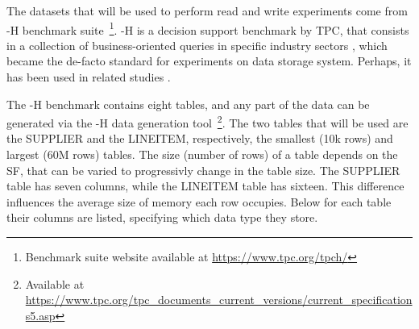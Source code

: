 The datasets that will be used to perform read and write experiments come from -H benchmark suite~\footnote{Benchmark suite website available at \url{https://www.tpc.org/tpch/}}. -H is a decision support benchmark by \gls{TPC}, that consists in a collection of business-oriented queries in specific industry sectors \cite{transactionprocessingperformancecounciltpcTPCH_v301pdf1993}, which became the de-facto standard for experiments on data storage system. Perhaps, it has been used in related studies \cite{raasveldtDuckDBEmbeddableAnalytical2019,behmPhotonFastQuery2022,manfrediReducingReadWrite2024}. 

The -H benchmark contains eight tables, and any part of the data can be generated via the -H data generation tool~\footnote{Available at \url{https://www.tpc.org/tpc_documents_current_versions/current_specifications5.asp}}. The two tables that will be used are the SUPPLIER and the LINEITEM, respectively, the smallest (10k rows) and largest (60M rows) tables. The size (number of rows) of a table depends on the \gls{SF}, that can be varied to progressivly change in the table size. The SUPPLIER table has seven columns, while the LINEITEM table has sixteen. This difference influences the average size of memory each row occupies. Below for each table their columns are listed, specifying which data type they store.
